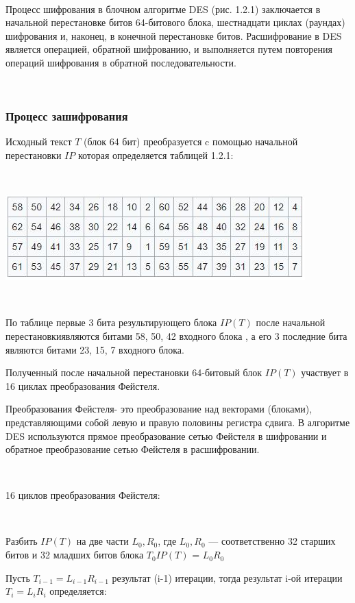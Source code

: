 \documentclass[a4paper]{report}
\begin{document}
~

Процесс шифрования в блочном алгоритме DES (рис. 1.2.1) заключается в начальной перестановке битов 64-битового блока, шестнадцати циклах (раундах) шифрования и, наконец, в конечной переста­новке битов. Расшифрование в DES является операцией, обратной шифрованию, и выполняется путем повторения операций шифрования в обратной последовательности.

~

\subsubsection{Процесс зашифрования}
Исходный текст $T$ (блок 64 бит) преобразуется c помощью начальной перестановки $IP$ которая определяется таблицей 1.2.1:

~

\includegraphics[scale=1.1]{табл}
{\\}

~

По таблице первые 3 бита результирующего блока $IP(T)$ после начальной перестановкиявляются битами 58, 50, 42 входного блока , а его 3 последние бита являются битами 23, 15, 7 входного блока.

Полученный после начальной перестановки 64-битовый блок $IP(T)$ участвует в 16 циклах преобразования Фейстеля.

Преобразования Фейстеля- это преобразование над векторами (блоками), представляющими собой левую и правую половины регистра сдвига. В алгоритме DES используются прямое преобразование сетью Фейстеля в шифровании и обратное преобразование сетью Фейстеля в расшифровании.

~

16 циклов преобразования Фейстеля:

~

Разбить $IP(T)$ на две части $L_0, R_0$, где $L_0, R_0$ — соответственно 32 старших битов и 32 младших битов блока $T_{0} IP(T)$ = $L_0 R_0$

Пусть $T_{i-1}=L_{i-1}R_{i-1}$ результат (i-1) итерации, тогда результат i-ой итерации $T_{i}=L_{i}R_{i}$ определяется:
\end{document}
